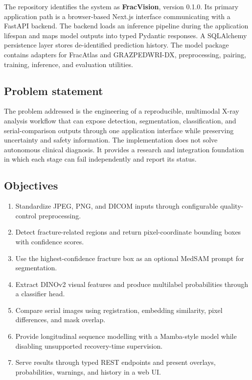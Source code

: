 \documentclass[12pt,a4paper]{article}
\begin{document}
The repository identifies the system as \textbf{FracVision}, version 0.1.0. Its primary application path is a browser-based Next.js interface communicating with a FastAPI backend. The backend loads an inference pipeline during the application lifespan and maps model outputs into typed Pydantic responses. A SQLAlchemy persistence layer stores de-identified prediction history. The model package contains adapters for FracAtlas and GRAZPEDWRI-DX, preprocessing, pairing, training, inference, and evaluation utilities.

\subsection{Problem statement}
The problem addressed is the engineering of a reproducible, multimodal X-ray analysis workflow that can expose detection, segmentation, classification, and serial-comparison outputs through one application interface while preserving uncertainty and safety information. The implementation does not solve autonomous clinical diagnosis. It provides a research and integration foundation in which each stage can fail independently and report its status.

\subsection{Objectives}
\begin{enumerate}[leftmargin=*]
\item Standardize JPEG, PNG, and DICOM inputs through configurable quality-control preprocessing.
\item Detect fracture-related regions and return pixel-coordinate bounding boxes with confidence scores.
\item Use the highest-confidence fracture box as an optional MedSAM prompt for segmentation.
\item Extract DINOv2 visual features and produce multilabel probabilities through a classifier head.
\item Compare serial images using registration, embedding similarity, pixel differences, and mask overlap.
\item Provide longitudinal sequence modelling with a Mamba-style model while disabling unsupported recovery-time supervision.
\item Serve results through typed REST endpoints and present overlays, probabilities, warnings, and history in a web UI.
\end{enumerate}
\end{document}
